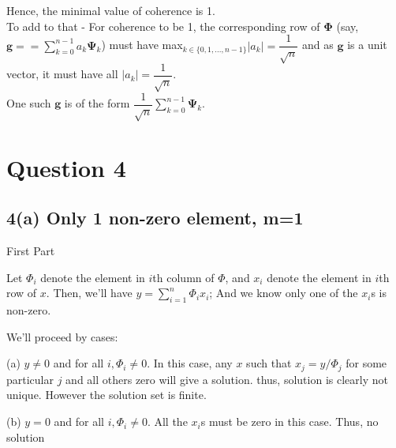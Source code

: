\documentclass[fleqn, 11pt]{article}
\begin{document}
Hence, the minimal value of coherence is 1. \\
To add to that - For coherence to be 1, the corresponding row of $\boldsymbol{\Phi}$ (say, $\boldsymbol{g} = = \sum_{k=0}^{n-1} a_k \boldsymbol{\Psi}_k$) must have max$_{k \in \{0,1,...,n-1\}} |a_k| = \dfrac{1}{\sqrt{n}}$ and as $\boldsymbol{g}$ is a unit vector, it must have all $|a_k| = \dfrac{1}{\sqrt{n}}$. \\
One such $\boldsymbol{g}$ is of the form $\dfrac{1}{\sqrt{n}} \sum_{k=0}^{n-1} \boldsymbol{\Psi}_k$.




































\newpage
\section*{Question 4}
\setcounter{equation}{0}

\subsection*{4(a) Only 1 non-zero element, m=1}

{\textsf{First Part}}

\medskip

Let $\Phi_i$ denote the element in $i$th column of $\Phi$, and 
$x_i$ denote the element in $i$th row of $x$. 
Then, we'll have $y=\displaystyle \sum_{i=1}^{n} \Phi_i x_i$; And we know only 
one of the $x_i$s is non-zero. 

We'll proceed by cases:

(a) $y \neq 0$ and for all $i, \Phi_i \neq 0$. In this case, any $x$ such that 
$x_j = y/\Phi_j $ for some particular $j$ and all others zero will give a 
solution. thus, solution is clearly not unique. However the solution set 
is finite. 

(b) $y = 0$ and for all $i, \Phi_i \neq 0$. All the $x_i$s must be zero in 
this case. Thus, no solution
\end{document}
